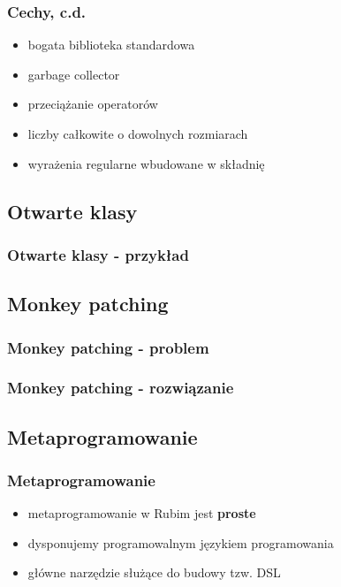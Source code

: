 \documentclass[12t]{beamer}
\begin{document}
\begin{frame}
  \frametitle{Cechy, c.d.}
  \begin{itemize}
  \item bogata biblioteka standardowa
  \item garbage collector
  \item przeciążanie operatorów
  \item liczby całkowite o dowolnych rozmiarach
  \item wyrażenia regularne wbudowane w składnię
  \end{itemize}
\end{frame}

\subsection{Otwarte klasy}
\begin{frame}
  \frametitle{Otwarte klasy - przykład}
  
\end{frame}

\subsection{Monkey patching}
\begin{frame}
  \frametitle{Monkey patching - problem}
  
\end{frame}

\begin{frame}
  \frametitle{Monkey patching - rozwiązanie}
  
\end{frame}

\subsection{Metaprogramowanie}
\begin{frame}
  \frametitle{Metaprogramowanie}
  \begin{itemize}
  \item metaprogramowanie w Rubim jest \textbf{proste}
  \item dysponujemy programowalnym językiem programowania
  \item główne narzędzie służące do budowy tzw. DSL
  \end{itemize}
\end{frame}
\end{document}
